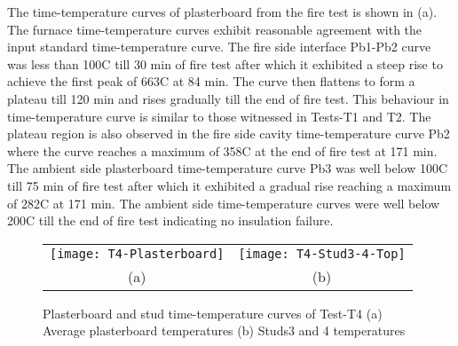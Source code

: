 The time-temperature curves of plasterboard from the fire test is shown in  (a). The furnace time-temperature curves exhibit reasonable agreement with the input standard time-temperature curve. The fire side interface Pb1-Pb2 curve was less than 100\degree C till 30 min of fire test after which it exhibited a steep rise to achieve the first peak of 663\degree C at 84 min. The curve then flattens to form a plateau till 120 min and rises gradually till the end of fire test. This behaviour in time-temperature curve is similar to those witnessed in Tests-T1 and T2. The plateau region is also observed in the fire side cavity time-temperature curve Pb2 where the curve reaches a maximum of 358\degree C at the end of fire test at 171 min. The ambient side plasterboard time-temperature curve Pb3 was well below 100\degree C till 75 min of fire test after which it exhibited a gradual rise reaching a maximum of  282\degree C at 171 min. The ambient side time-temperature curves were well below 200\degree C till the end of fire test indicating no insulation failure.
\begin{figure}[!htbp]
	\centering
		\begin{tabular}{cc}
			\texttt{[image: T4-Plasterboard]} & \texttt{[image: T4-Stud3-4-Top]} \\
			(a) & (b) \\
		\end{tabular} 
		\caption{Plasterboard and stud time-temperature curves of Test-T4 (a) Average plasterboard temperatures (b) Studs3 and 4 temperatures}
		\label{fig:T4-PB-Stud}
\end{figure}

